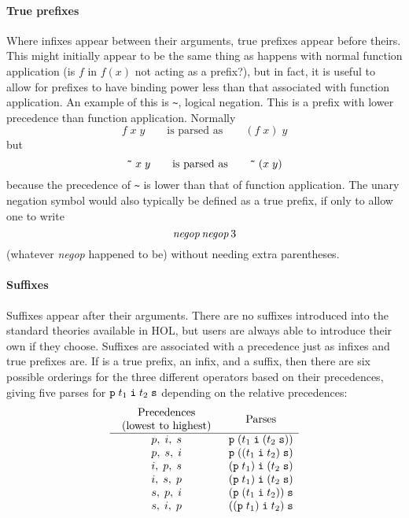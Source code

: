{\paragraph{True prefixes}

Where infixes appear between their arguments, true prefixes appear
before theirs.  This might initially appear to be the same thing as
happens with normal function application (is $f$ in $f(x)$ not acting
as a prefix?), but in fact, it is useful to allow for prefixes to have
binding power less than that associated with function application.  An
example of this is \verb+~+, logical negation.  This is a prefix with
lower precedence than function application.  Normally
\[
   f\;x\; y\qquad \mbox{is parsed as}\qquad (f\; x)\; y
\] but \[
  \holtxt{\~{}}\; x\; y\qquad\mbox{is parsed as}\qquad
  \holtxt{\~{}}\; (x\; y)
\] because the precedence of \verb+~+ is lower than that of function
application.  The unary negation symbol would also typically be
defined as a true prefix, if only to allow one to write \[ {\it
  negop}\,{\it negop}\,3
\] (whatever {\it negop} happened to be) without needing extra parentheses.

\paragraph{Suffixes}

Suffixes appear after their arguments.  There are no suffixes
introduced into the standard theories available in HOL, but users are
always able to introduce their own if they choose.  Suffixes are
associated with a precedence just as infixes and true prefixes are.
If  is a true prefix,  an infix, and  a
suffix, then there are six possible orderings for the three different
operators based on their precedences, giving five parses for
$\holtxt{p}\; t_1\; \holtxt{i}\; t_2\; \holtxt{s}$ depending on the relative
precedences:
\[
\begin{array}{cl}
\mbox{\begin{tabular}{c}Precedences\\(lowest to highest)\end{tabular}} &
\multicolumn{1}{c}{\mbox{Parses}}\\
\hline
p,\;i,\;s & \holtxt{p}\;(t_1\;\holtxt{i}\;(t_2\;\holtxt{s}))\\
p,\;s,\;i & \holtxt{p}\;((t_1\;\holtxt{i}\;t_2)\;\holtxt{s})\\
i,\;p,\;s & (\holtxt{p}\;t_1)\;\holtxt{i}\;(t_2\;\holtxt{s})\\
i,\;s,\;p & (\holtxt{p}\;t_1)\;\holtxt{i}\;(t_2\;\holtxt{s})\\
s,\;p,\;i & (\holtxt{p}\;(t_1\;\holtxt{i}\;t_2))\;\holtxt{s}\\
s,\;i,\;p & ((\holtxt{p}\;t_1)\;\holtxt{i}\;t_2)\;\holtxt{s}\\
\end{array}
\]

}
